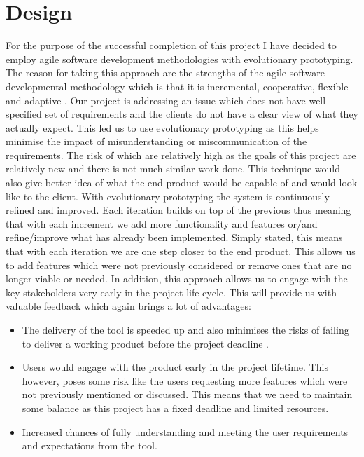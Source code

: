 \chapter{Design}
For the purpose of the successful completion of this project I have decided to employ agile software development methodologies with evolutionary prototyping. The reason for taking this approach are the strengths of the agile software developmental methodology which is that it is incremental, cooperative, flexible and adaptive \cite{4147390}. Our project is addressing an issue which does not have well specified set of requirements and the clients do not have a clear view of what they actually expect. This led us to use  evolutionary prototyping \cite{Connell89} as this helps minimise the impact of misunderstanding or miscommunication of the requirements. The risk of which are relatively high as the goals of this project are relatively new and there is not much similar work done. This technique would also give better idea of what the end product would be capable of and would look like to the client. With evolutionary prototyping the system is continuously refined and improved. Each iteration builds on top of the previous thus meaning that with each increment we add more functionality and features or/and refine/improve what has already been implemented. Simply stated, this means that with each iteration we are one step closer to the end product. This allows us to add features which were not previously considered or remove ones that are no longer viable or needed. In addition, this approach allows us to engage with the key stakeholders very early in the project life-cycle. This will provide us with valuable feedback which again brings a lot of advantages:

\begin{itemize}
	\item The delivery of the tool is speeded up and also minimises the risks of failing to deliver a working product before the project deadline \cite{Connell89}.
	\item Users would engage with the product early in the project lifetime. This however, poses some risk like the users requesting more features which were not previously mentioned or discussed. This means that we need to maintain some balance as this project has a fixed deadline and limited resources.
	\item Increased chances of fully understanding and meeting the user requirements and expectations from the tool.
\end{itemize}

